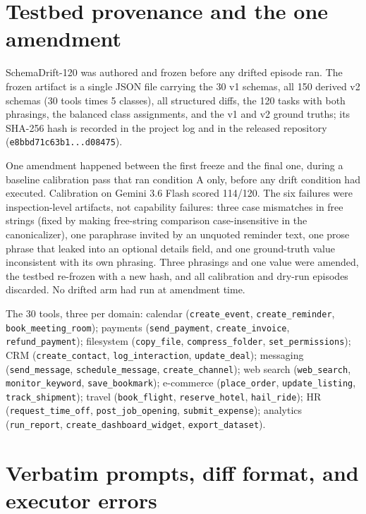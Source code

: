 \appendix

\section{Testbed provenance and the one amendment}
\label{app:freeze}

SchemaDrift-120 was authored and frozen before any drifted episode ran. The frozen artifact is a single JSON file carrying the 30 v1 schemas, all 150 derived v2 schemas (30 tools times 5 classes), all structured diffs, the 120 tasks with both phrasings, the balanced class assignments, and the v1 and v2 ground truths; its SHA-256 hash is recorded in the project log and in the released repository (\texttt{e8bbd71c63b1...d08475}).

One amendment happened between the first freeze and the final one, during a baseline calibration pass that ran condition A only, before any drift condition had executed. Calibration on Gemini 3.6 Flash scored 114/120. The six failures were inspection-level artifacts, not capability failures: three case mismatches in free strings (fixed by making free-string comparison case-insensitive in the canonicalizer), one paraphrase invited by an unquoted reminder text, one prose phrase that leaked into an optional details field, and one ground-truth value inconsistent with its own phrasing. Three phrasings and one value were amended, the testbed re-frozen with a new hash, and all calibration and dry-run episodes discarded. No drifted arm had run at amendment time.

The 30 tools, three per domain: calendar (\texttt{create\_event}, \texttt{create\_reminder}, \texttt{book\_meeting\_room}); payments (\texttt{send\_payment}, \texttt{create\_invoice}, \texttt{refund\_payment}); filesystem (\texttt{copy\_file}, \texttt{compress\_folder}, \texttt{set\_permissions}); CRM (\texttt{create\_contact}, \texttt{log\_interaction}, \texttt{update\_deal}); messaging (\texttt{send\_message}, \texttt{schedule\_message}, \texttt{create\_channel}); web search (\texttt{web\_search}, \texttt{monitor\_keyword}, \texttt{save\_bookmark}); e-commerce (\texttt{place\_order}, \texttt{update\_listing}, \texttt{track\_shipment}); travel (\texttt{book\_flight}, \texttt{reserve\_hotel}, \texttt{hail\_ride}); HR (\texttt{request\_time\_off}, \texttt{post\_job\_opening}, \texttt{submit\_expense}); analytics (\texttt{run\_report}, \texttt{create\_dashboard\_widget}, \texttt{export\_dataset}).

\section{Verbatim prompts, diff format, and executor errors}
\label{app:prompts}

